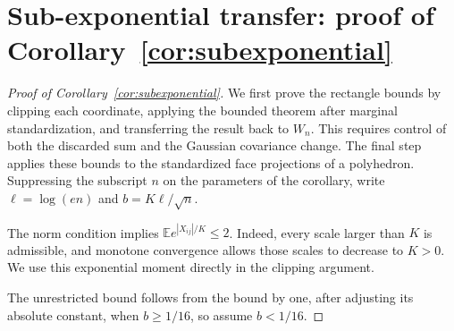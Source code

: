 \documentclass[11pt,letterpaper]{article}
\theoremstyle{remark}
\newcommand{\E}{\mathbb E}
\begin{document}
\section{\texorpdfstring{Sub-exponential transfer: proof of Corollary~\ref{cor:subexponential}}{Sub-exponential transfer: proof of Corollary 3}}\label{app:subexponential}
\begin{proof}[Proof of Corollary~\ref{cor:subexponential}]
We first prove the rectangle bounds by clipping each coordinate,
applying the bounded theorem after marginal standardization, and
transferring the result back to \(W_n\). This requires control of both
the discarded sum and the Gaussian covariance change. The final step
applies these bounds to the standardized face projections of a polyhedron.
Suppressing the subscript \(n\) on the parameters of the corollary,
write \(\ell=\log(en)\) and \(b=K\ell/\sqrt n\).

The norm condition implies \(\E e^{|X_{ij}|/K}\le2\). Indeed,
every scale larger than \(K\) is admissible, and monotone convergence
allows those scales to decrease to \(K>0\). We use this exponential
moment directly in the clipping argument.

The unrestricted bound follows from the bound by one, after adjusting its absolute
constant, when \(b\ge1/16\), so assume \(b<1/16\).


\end{proof}
\end{document}
